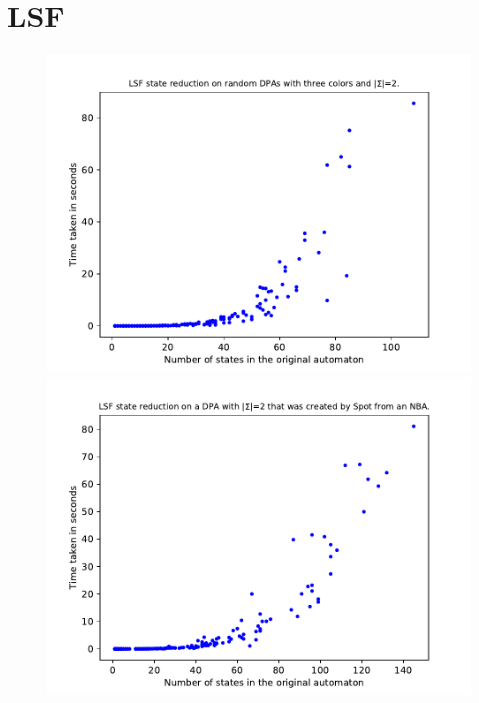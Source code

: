\section{LSF}
\begin{figure}
	\centering
	\begin{minipage}{0.49\textwidth}
		\includegraphics[page=6,height=.3\textheight]{../data/analysis/lsf/gendet_ap1.pdf} 
		\includegraphics[page=6,height=.3\textheight]{../data/analysis/lsf/detspot_ap1.pdf} 

\end{minipage}
\end{figure}
